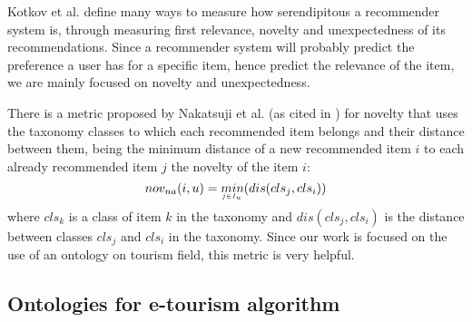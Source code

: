 Kotkov et al. \cite{kotkov2016survey} define many ways to measure how serendipitous a recommender system is, through measuring first relevance, novelty and unexpectedness of its recommendations. Since a recommender system will probably predict the preference a user has for a specific item, hence predict the relevance of the item, we are mainly focused on novelty and unexpectedness.

There is a metric proposed by Nakatsuji et al. (as cited in \cite{kotkov2016survey}) for novelty that uses the taxonomy classes to which each recommended item belongs and their distance between them, being the minimum distance of a new recommended item $i$ to each already recommended item $j$ the novelty of the item $i$:
\begin{equation}
    nov_{na}(i, u) = \underaccent{j \in I_u}{min}(dis(cls_j, cls_i))
\end{equation}
where $cls_k$ is a class of item $k$ in the taxonomy and $dis(cls_j, cls_i)$ is the distance between classes $cls_j$ and $cls_i$ in the taxonomy. Since our work is focused on the use of an ontology on tourism field, this metric is very helpful.

\subsection{Ontologies for e-tourism algorithm}
